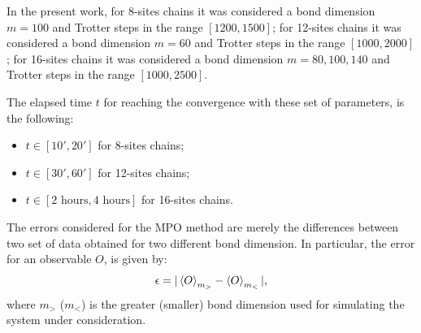In the present work, for 8-sites chains it was considered a bond dimension $m = 100$ and Trotter steps in the range $[1200, 1500]$; for 12-sites chains it was considered a bond dimension $m = 60$ and Trotter steps in the range $[1000, 2000]$; for 16-sites chains it was considered a bond dimension $m = 80, 100, 140$ and Trotter steps in the range $[1000, 2500]$.

The elapsed time $t$ for reaching the convergence with these set of parameters, is the following:
\begin{itemize}
    \item $t \in [10', 20']$ for 8-sites chains;
    \item $t \in [30', 60']$ for 12-sites chains;
    \item $t \in [2 \text{ hours}, 4 \text{ hours}]$ for 16-sites chains.
\end{itemize}

The errors considered for the MPO method are merely the differences between two set of data obtained for two different bond dimension. In particular, the error for an observable $O$, is given by:
\begin{equation*}
    \epsilon = |\braket{O}_{m_>} - \braket{O}_{m_<}|,
\end{equation*}
where $m_>$ ($m_<$) is the greater (smaller) bond dimension used for simulating the system under consideration.

